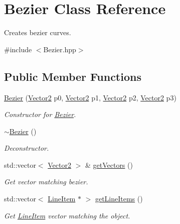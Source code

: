 \hypertarget{classBezier}{}\section{Bezier Class Reference}
\label{classBezier}


Creates bezier curves.  




{\ttfamily \#include $<$Bezier.\+hpp$>$}

\subsection*{Public Member Functions}
\begin{DoxyCompactItemize}
\item 
\mbox{\hyperlink{classBezier_aeee0e41ed64d1a61d7ac103d2300093b}{Bezier}} (\mbox{\hyperlink{classVector2}{Vector2}} p0, \mbox{\hyperlink{classVector2}{Vector2}} p1, \mbox{\hyperlink{classVector2}{Vector2}} p2, \mbox{\hyperlink{classVector2}{Vector2}} p3)
\begin{DoxyCompactList}\small\item\em Constructor for \mbox{\hyperlink{classBezier}{Bezier}}. \end{DoxyCompactList}\item 
\mbox{\hyperlink{classBezier_a32f81ea72bd31a4607b4168839ea8815}{$\sim$\+Bezier}} ()
\begin{DoxyCompactList}\small\item\em Deconstructor. \end{DoxyCompactList}\item 
std\+::vector$<$ \mbox{\hyperlink{classVector2}{Vector2}} $>$ \& \mbox{\hyperlink{classBezier_a26bf332b0c831e0f302f1d72ec782436}{get\+Vectors}} ()
\begin{DoxyCompactList}\small\item\em Get vector matching bezier. \end{DoxyCompactList}\item 
\mbox{\label{classBezier_ad4417fabe40db932edc57406d1ab302a}} 
std\+::vector$<$ \mbox{\hyperlink{classLineItem}{Line\+Item}} $\ast$ $>$ \mbox{\hyperlink{classBezier_ad4417fabe40db932edc57406d1ab302a}{get\+Line\+Items}} ()
\begin{DoxyCompactList}\small\item\em Get \mbox{\hyperlink{classLineItem}{Line\+Item}} vector matching the object. \end{DoxyCompactList}\item 

\end{DoxyCompactItemize}

